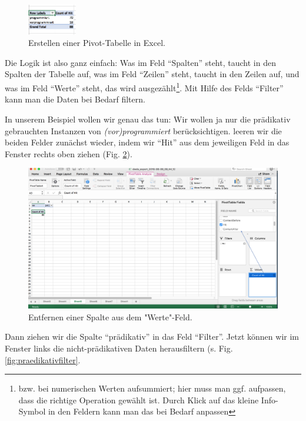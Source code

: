 \documentclass[]{article}
\let\rmarkdownfootnote\footnote%
\def\footnote{\protect\rmarkdownfootnote}
\begin{document}
\begin{figure}
\includegraphics[width=0.84in]{fig/excel_simplepivot} \caption{Erstellen einer Pivot-Tabelle in Excel.}\label{fig:excelpivotsimple}
\end{figure}

Die Logik ist also ganz einfach: Was im Feld ``Spalten'' steht, taucht
in den Spalten der Tabelle auf, was im Feld ``Zeilen'' steht, taucht in
den Zeilen auf, und was im Feld ``Werte'' steht, das wird
ausgezählt\footnote{bzw. bei numerischen Werten aufsummiert; hier muss
  man ggf. aufpassen, dass die richtige Operation gewählt ist. Durch
  Klick auf das kleine Info-Symbol in den Feldern kann man das bei
  Bedarf anpassen}. Mit Hilfe des Felds ``Filter'' kann man die Daten
bei Bedarf filtern.

In unserem Beispiel wollen wir genau das tun: Wir wollen ja nur die
prädikativ gebrauchten Instanzen von \emph{(vor)programmiert}
berücksichtigen. leeren wir die beiden Felder zunächst wieder, indem wir
``Hit'' aus dem jeweiligen Feld in das Fenster rechts oben ziehen (Fig.
\ref{fig:countofhit}).

\begin{figure}
\includegraphics[width=6.36in]{fig/countofhit} \caption{Entfernen einer Spalte aus dem "Werte"-Feld.}\label{fig:countofhit}
\end{figure}

Dann ziehen wir die Spalte ``prädikativ'' in das Feld ``Filter''. Jetzt
können wir im Fenster links die nicht-prädikativen Daten herausfiltern
(s. Fig. \ref{fig:praedikativfilter}.
\end{document}
